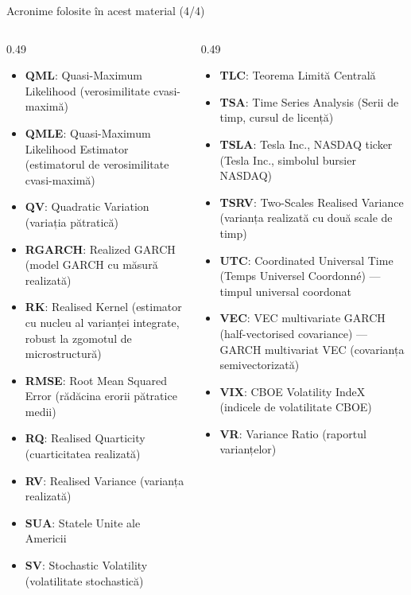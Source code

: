 \begin{frame}{Acronime folosite în acest material (4/4)}
\begin{columns}[T]
\begin{column}{0.49\textwidth}
\begin{itemize}\setlength{\itemsep}{0pt}
    \item \textbf{QML}: Quasi-Maximum Likelihood (verosimilitate cvasi-maximă)
    \item \textbf{QMLE}: Quasi-Maximum Likelihood Estimator (estimatorul de verosimilitate cvasi-maximă)
    \item \textbf{QV}: Quadratic Variation (variația pătratică)
    \item \textbf{RGARCH}: Realized GARCH (model GARCH cu măsură realizată)
    \item \textbf{RK}: Realised Kernel (estimator cu nucleu al varianței integrate, robust la zgomotul de microstructură)
    \item \textbf{RMSE}: Root Mean Squared Error (rădăcina erorii pătratice medii)
    \item \textbf{RQ}: Realised Quarticity (cuarticitatea realizată)
    \item \textbf{RV}: Realised Variance (varianța realizată)
    \item \textbf{SUA}: Statele Unite ale Americii
    \item \textbf{SV}: Stochastic Volatility (volatilitate stochastică)
\end{itemize}
\end{column}
\begin{column}{0.49\textwidth}
\begin{itemize}\setlength{\itemsep}{0pt}
    \item \textbf{TLC}: Teorema Limită Centrală
    \item \textbf{TSA}: Time Series Analysis (Serii de timp, cursul de licență)
    \item \textbf{TSLA}: Tesla Inc., NASDAQ ticker (Tesla Inc., simbolul bursier NASDAQ)
    \item \textbf{TSRV}: Two-Scales Realised Variance (varianța realizată cu două scale de timp)
    \item \textbf{UTC}: Coordinated Universal Time (Temps Universel Coordonné) — timpul universal coordonat
    \item \textbf{VEC}: VEC multivariate GARCH (half-vectorised covariance) — GARCH multivariat VEC (covarianța semivectorizată)
    \item \textbf{VIX}: CBOE Volatility IndeX (indicele de volatilitate CBOE)
    \item \textbf{VR}: Variance Ratio (raportul varianțelor)
\end{itemize}
\end{column}
\end{columns}
\end{frame}

